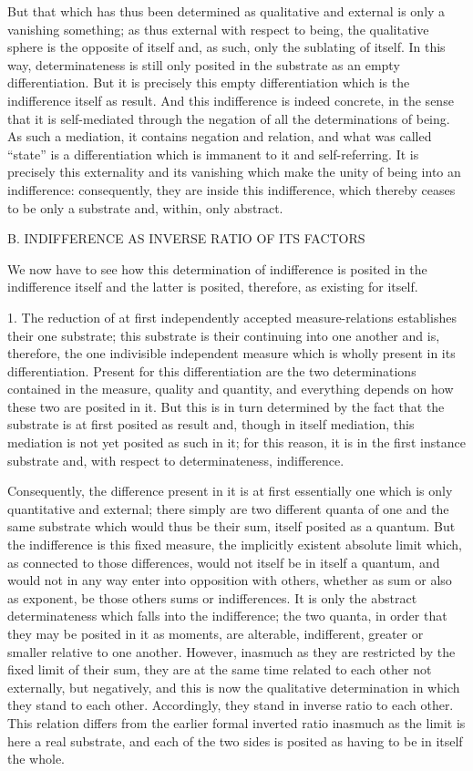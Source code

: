 But that which has thus been determined
as qualitative and external
is only a vanishing something;
as thus external with respect to being,
the qualitative sphere is the opposite of itself
and, as such, only the sublating of itself.
In this way, determinateness is still
only posited in the substrate
as an empty differentiation.
But it is precisely this empty differentiation
which is the indifference itself as result.
And this indifference is indeed concrete,
in the sense that it is self-mediated
through the negation of all the determinations of being.
As such a mediation, it contains negation and relation,
and what was called “state” is a differentiation
which is immanent to it and self-referring.
It is precisely this externality and its vanishing
which make the unity of being into an indifference:
consequently, they are inside this indifference,
which thereby ceases to be only a substrate
and, within, only abstract.

B. INDIFFERENCE AS INVERSE RATIO OF ITS FACTORS

We now have to see how this determination
of indifference is posited in the indifference itself
and the latter is posited, therefore, as existing for itself.

1. The reduction of at first
independently accepted measure-relations
establishes their one substrate;
this substrate is their continuing into one another
and is, therefore, the one indivisible independent measure
which is wholly present in its differentiation.
Present for this differentiation are
the two determinations contained
in the measure, quality and quantity,
and everything depends on how these two are posited in it.
But this is in turn determined by the fact that
the substrate is at first posited as result
and, though in itself mediation,
this mediation is not yet posited as such in it;
for this reason, it is in the first instance substrate
and, with respect to determinateness, indifference.

Consequently, the difference present in it is
at first essentially one which is only quantitative and external;
there simply are two different quanta of one and the same substrate
which would thus be their sum, itself posited as a quantum.
But the indifference is this fixed measure,
the implicitly existent absolute limit which,
as connected to those differences,
would not itself be in itself a quantum,
and would not in any way enter
into opposition with others,
whether as sum or also as exponent,
be those others sums or indifferences.
It is only the abstract determinateness
which falls into the indifference;
the two quanta, in order that
they may be posited in it as moments,
are alterable, indifferent, greater or smaller
relative to one another.
However, inasmuch as they are restricted
by the fixed limit of their sum,
they are at the same time related to
each other not externally, but negatively,
and this is now the qualitative determination
in which they stand to each other.
Accordingly, they stand in inverse ratio to each other.
This relation differs from the earlier formal inverted ratio
inasmuch as the limit is here a real substrate,
and each of the two sides is posited as
having to be in itself the whole.

